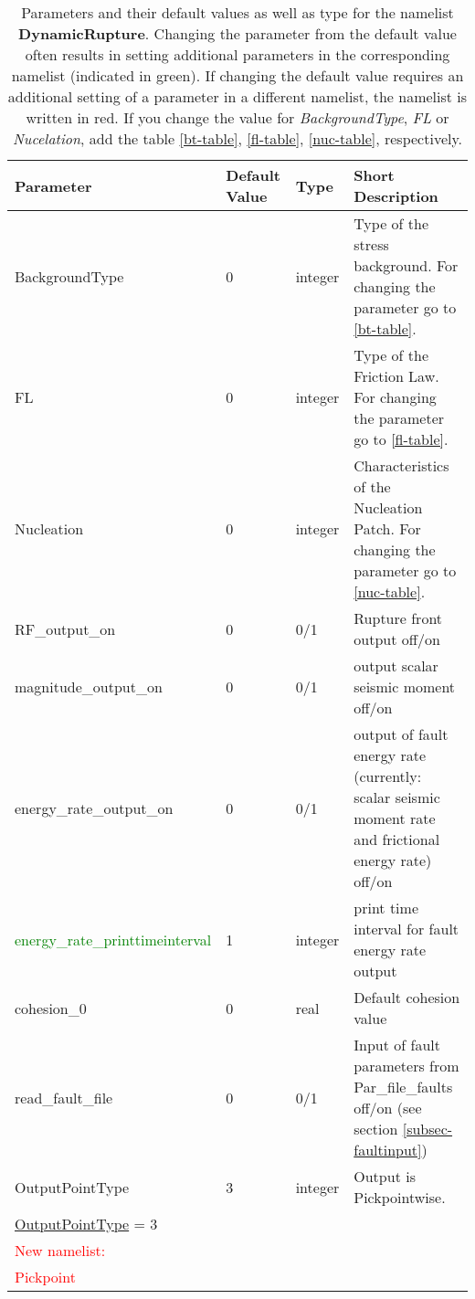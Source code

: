 \documentclass[12pt,twoside]{article}
\begin{document}
\begin{longtable}{|p{4.8cm}|p{2.4cm}|p{2cm}|p{5cm}|}
\caption{Parameters and their default values as well as type for the namelist \textbf{DynamicRupture}.
         Changing the parameter from the default value often results in setting additional parameters
         in the corresponding namelist (indicated in green).
         If changing the default value requires an additional setting of a parameter in a different namelist,
         the namelist is written in red. If you change the value for
         \textit{BackgroundType}, \textit{FL} or \textit{Nucelation}, add the table \ref{bt-table},
         \ref{fl-table}, \ref{nuc-table}, respectively.} \\
\hline
Parameter & Default Value & Type & Short Description \\
\hline
\hline
BackgroundType & 0 & integer & Type of the stress background. For changing the parameter go to \ref{bt-table}.\\
\hline
FL & 0 & integer & Type of the Friction Law. For changing the parameter go to \ref{fl-table}.\\
\hline
Nucleation & 0 & integer &  Characteristics of the Nucleation Patch. For changing the parameter go to \ref{nuc-table}.\\
\hline
RF\_output\_on & 0 & 0/1 & Rupture front output off/on\\
\hline
magnitude\_output\_on & 0 & 0/1 & output scalar seismic moment off/on\\
\hline
energy\_rate\_output\_on & 0 & 0/1 & output of fault energy rate (currently: scalar seismic moment rate and frictional energy rate) off/on\\
\hline
\textcolor{green}{energy\_rate\_printtimeinterval} & 1 & integer & print time interval for fault energy rate output\\
\hline
cohesion\_0 & 0 & real & Default cohesion value\\
\hline
read\_fault\_file & 0 & 0/1 & Input of fault parameters from Par\_file\_faults off/on (see section \ref{subsec-faultinput})\\
\hline
OutputPointType & 3 & integer & Output is Pickpointwise.\\
\hdashline
\uline{OutputPointType} = 3 & & &\\
\textcolor{red}{New namelist:} & & &\\
\textcolor{red}{Pickpoint} & & &\\

\end{longtable}
\end{document}
